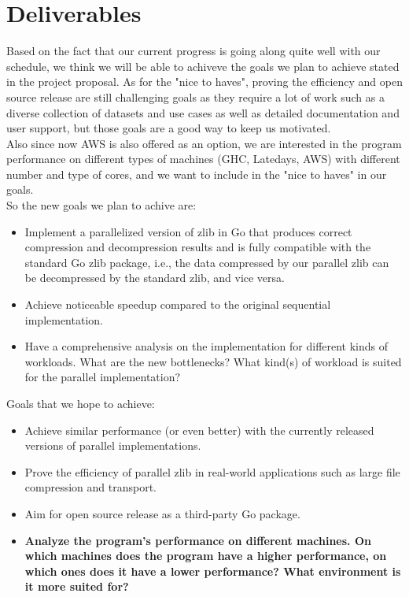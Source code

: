 \documentclass{article}
\begin{document}
\section{Deliverables}
Based on the fact that our current progress is going along quite well with our schedule, we think we will be able to achiveve the goals we plan to achieve stated in the project proposal. As for the "nice to haves", proving the efficiency and open source release are still challenging goals as they require a lot of work such as a diverse collection of datasets and use cases as well as detailed documentation and user support, but those goals are a good way to keep us motivated.\\
Also since now AWS is also offered as an option, we are interested in the program performance on different types of machines (GHC, Latedays, AWS) with different number and type of cores, and we want to include in the "nice to haves" in our goals.\\
So the new goals we plan to achive are:
\begin{itemize}
    \item Implement a parallelized version of zlib in Go that produces correct compression and decompression results and is fully compatible with the standard Go zlib package, i.e.,  the data compressed by our parallel zlib can be decompressed by the standard zlib, and vice versa.
    \item Achieve noticeable speedup compared to the original sequential implementation.
    \item Have a comprehensive analysis on the implementation for different kinds of workloads. What are the new bottlenecks? What kind(s) of workload is suited for the parallel implementation?
\end{itemize}

\noindent Goals that we hope to achieve:
\begin{itemize}
    \item Achieve similar performance (or even better) with the currently released versions of parallel implementations.
    \item Prove the efficiency of parallel zlib in real-world applications such as large file compression and transport.
    \item Aim for open source release as a third-party Go package.
    \item \textbf{Analyze the program's performance on different machines. On which machines does the program have a higher performance, on which ones does it have a lower performance? What environment is it more suited for?}
\end{itemize}
\end{document}
